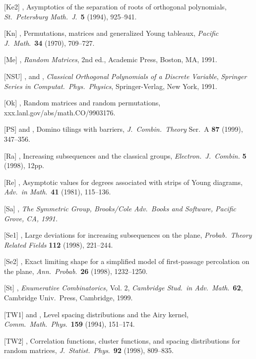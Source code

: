[Ke2] \bibline,  Asymptotics of the separation of roots of orthogonal
polynomials, 
 {\it St.\ Petersburg Math.\ J\/}.\ {\bf 5} (1994),
925--941.

[Kn] ,  Permutations, matrices and generalized Young
tableaux, {\it Pacific J.\ Math\/}.\ {\bf 34} (1970), 709--727.

[Me] ,  {\it Random Matrices}, 2nd ed., Academic Press, 
Boston, MA, 1991.

[NSU] , and , {\it Classical
Orthogonal Polynomials of a Discrete Variable}, {\it Springer Series in
Computat.\ Phys.\  Physics\/}, Springer-Verlag, New York, 1991.

[Ok] , Random matrices and random permutations,\hfill\break  
xxx.lanl.gov/abs/math.CO/9903176.  

[PS]   and ,  Domino tilings with barriers,
{\it J.\ Combin.\ Theory\/} Ser.\ A {\bf 87} (1999), 347--356.

[Ra] ,  Increasing subsequences and the classical
groups, {\it Electron.\ J.\ Combin.\/} {\bf 5} (1998), 12pp.

[Re] ,  Asymptotic values for degrees associated with
strips of Young diagrams, {\it Adv.\ in Math\/}.\ {\bf 41} (1981),
115--136.

[Sa] , \it The Symmetric Group\rm, Brooks/Cole 
Adv.\ Books and Software, Pacific Grove, CA,  1991.

[Se1] ,  Large deviations for increasing
subsequences on the plane, {\it Probab.\ Theory Related Fields\/} {\bf 112}
(1998), 221--244.

[Se2] \bibline,  Exact limiting shape for a simplified
model of first-passage percolation on the plane, {\it Ann.\ Probab\/}.\ 
{\bf 26}
(1998), 1232--1250.

[St] , {\it Enumerative Combinatorics,} Vol. 2,
{\it Cambridge Stud.\ in Adv.\ Math\/}.\ {\bf 62}, Cambridge Univ.\ Press, Cambridge, 1999.

[TW1]  and ,  Level spacing distributions and
the Airy kernel, {\it Comm.\ Math.\ Phys\/}.\ {\bf 159} (1994),
151--174. 

[TW2] \bibline,  Correlation functions, cluster
functions, and spacing distributions for random matrices,
{\it J.\ Statist.\ Phys\/}.\ {\bf 92} (1998), 809--835.

